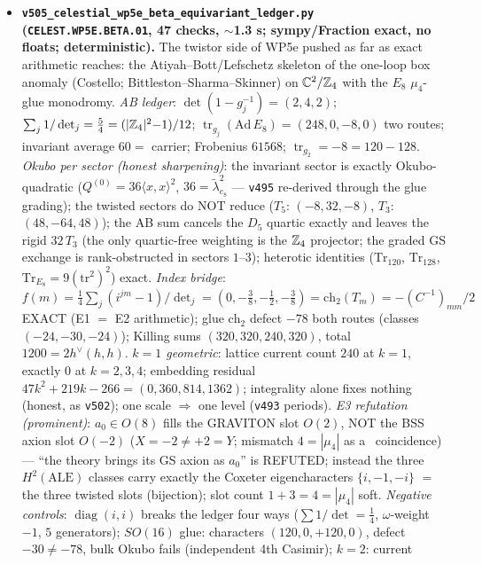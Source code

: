 \documentclass[11pt]{article}
\begin{document}
\begin{itemize}[leftmargin=1.5em]
\item \textbf{\texttt{v505\_celestial\_wp5e\_beta\_equivariant\_ledger.py} (\texttt{CELEST.WP5E.BETA.01},
47 checks, $\sim$1.3 s; sympy/Fraction exact, no floats; deterministic).} The twistor side of WP5e
pushed as far as exact arithmetic reaches: the Atiyah--Bott/Lefschetz skeleton of the one-loop box
anomaly (Costello; Bittleston--Sharma--Skinner) on $\mathbb C^2/\mathbb{Z}_4$ with the $E_8$ $\mu_4$-glue
monodromy. \emph{AB ledger}: $\det(1-g_j^{-1})=(2,4,2)$; $\sum_j1/\det_j=\tfrac54=(|\mathbb{Z}_4|^2{-}1)/12$;
$\operatorname{tr}_{g_j}(\mathrm{Ad}\,E_8)=(248,0,-8,0)$ two routes; invariant average $60=$ carrier;
Frobenius $61568$; $\operatorname{tr}_{g_2}=-8=120-128$. \emph{Okubo per sector (honest
sharpening)}: the invariant sector is exactly Okubo-quadratic ($Q^{(0)}=36\langle x,x\rangle^2$,
$36=\tilde\lambda^2_{e_8}$ --- \texttt{v495} re-derived through the glue grading); the twisted
sectors do NOT reduce ($T_5$: $(-8,32,-8)$, $T_3$: $(48,-64,48)$); the AB sum cancels the $D_5$
quartic exactly and leaves the rigid $32\,T_3$ (the only quartic-free weighting is the $\mathbb{Z}_4$
projector; the graded GS exchange is rank-obstructed in sectors $1$--$3$); heterotic identities
($\mathrm{Tr}_{120}$, $\mathrm{Tr}_{128}$, $\mathrm{Tr}_{E_8}=9(\mathrm{tr}^2)^2$) exact.
\emph{Index bridge}: $f(m)=\tfrac14\sum_j(i^{jm}{-}1)/\det_j=(0,-\tfrac38,-\tfrac12,-\tfrac38)
=\mathrm{ch}_2(T_m)=-(C^{-1})_{mm}/2$ EXACT (E1 $=$ E2 arithmetic); glue $\mathrm{ch}_2$ defect
$-78$ both routes (classes $(-24,-30,-24)$); Killing sums $(320,320,240,320)$, total
$1200=2h^\vee(h,h)$. \emph{$k=1$ geometric}: lattice current count $240$ at $k{=}1$, exactly $0$ at
$k=2,3,4$; embedding residual $47k^2{+}219k{-}266=(0,360,814,1362)$; integrality alone fixes
nothing (honest, as \texttt{v502}); one scale $\Rightarrow$ one level (\texttt{v493} periods).
\emph{E3 refutation (prominent)}: $a_0\in O(8)$ fills the GRAVITON slot $O(2)$, NOT the BSS axion
slot $O(-2)$ ($X=-2\neq+2=Y$; mismatch $4=|\mu_4|$ as a \mC\ coincidence) --- ``the theory brings
its GS axion as $a_0$'' is REFUTED; instead the three $H^2(\mathrm{ALE})$ classes carry exactly the
Coxeter eigencharacters $\{i,-1,-i\}$ $=$ the three twisted slots (bijection); slot count $1{+}3=4
=|\mu_4|$ soft. \emph{Negative controls}: $\operatorname{diag}(i,i)$ breaks the ledger four ways
($\sum1/\det=\tfrac14$, $\omega$-weight $-1$, $5$ generators); $SO(16)$ glue: characters
$(120,0,+120,0)$, defect $-30\neq-78$, bulk Okubo fails (independent 4th Casimir); $k=2$: current

\end{itemize}
\end{document}
